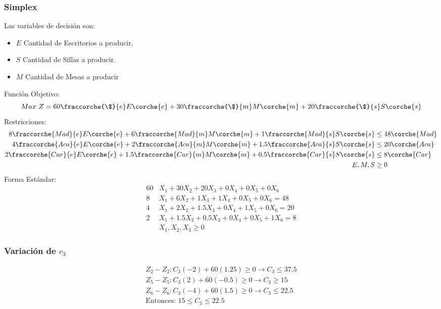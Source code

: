 \begin{homeworkProblem}[1][Dakota]
\subsubsection{Simplex}
Las variables de decisión son:
\begin{itemize}
	\item $E$ Cantidad de Escritorios a producir.
  \item $S$ Cantidad de Sillas a producir.
  \item $M$ Cantidad de Mesas a producir  
\end{itemize}
Función Objetivo: 
\begin{equation}
Max\ Z =  60\fraccorche{\$}{e}E\corche{e} +
          30\fraccorche{\$}{m}M\corche{m} +
          20\fraccorche{\$}{s}S\corche{s}
\end{equation}
Restricciones:
\begin{align*}
8\fraccorche{Mad}{e}E\corche{e} + 6\fraccorche{Mad}{m}M\corche{m} + 1\fraccorche{Mad}{s}S\corche{s} &\le 48\corche{Mad} \\
4\fraccorche{Aca}{e}E\corche{e} + 2\fraccorche{Aca}{m}M\corche{m} + 1.5\fraccorche{Aca}{s}S\corche{s} &\le 20\corche{Aca} \\
2\fraccorche{Car}{e}E\corche{e} + 1.5\fraccorche{Car}{m}M\corche{m} + 0.5\fraccorche{Car}{s}S\corche{s} &\le 8\corche{Car} \\
E,M,S &\ge 0
\end{align*}
Forma Estándar:
\begin{align*}
	60&X_1 + 30X_2 + 20X_3 + 0X_4 + 0X_5 + 0X_6 \\
  8&X_1 + 6X_2 + 1X_3 + 1X_4 + 0X_5 + 0X_6 = 48 \\
  4&X_1 + 2X_2 + 1.5X_3 + 0X_4 + 1X_5 + 0X_6 = 20 \\
  2&X_1 + 1.5X_2 + 0.5X_3 + 0X_4 + 0X_5 + 1X_6 = 8 \\
  &X_1,X_2,X_3 \ge 0
\end{align*}

\subsubsection{Variación de $c_3$}
\begin{align*}
  Z_2 - Z_2 : C_3(-2) + 60(1.25) \ge 0 \rightarrow C_3 \le 37.5 \\
  Z_5 - Z_5 : C_3(2) + 60(-0.5) \ge 0 \rightarrow C_3 \ge 15\\
  Z_6 - Z_6 : C_3(-4) + 60(1.5) \ge 0 \rightarrow C_3 \le 22.5 \\
  \text{Entonces: } 15 \le C_3 \le 22.5
\end{align*}



\end{homeworkProblem}
